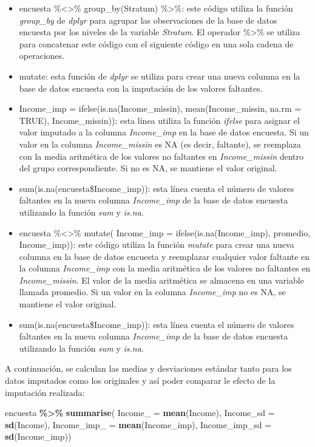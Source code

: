 \documentclass[
  12pt,
]{book}
\newenvironment{Shaded}{\begin{snugshade}}{\end{snugshade}}
\newcommand{\AttributeTok}[1]{\textcolor[rgb]{0.13,0.29,0.53}{#1}}
\newcommand{\FunctionTok}[1]{\textcolor[rgb]{0.13,0.29,0.53}{\textbf{#1}}}
\newcommand{\NormalTok}[1]{#1}
\newcommand{\SpecialCharTok}[1]{\textcolor[rgb]{0.81,0.36,0.00}{\textbf{#1}}}
\begin{document}
\begin{itemize}
\item
  encuesta \%\textless\textgreater\% group\_by(Stratum) \%\textgreater\%: este código utiliza la función \emph{group\_by} de \emph{dplyr} para agrupar las observaciones de la base de datos encuesta por los niveles de la variable \emph{Stratum}. El operador \%\textgreater\% se utiliza para concatenar este código con el siguiente código en una sola cadena de operaciones.
\item
  mutate: esta función de \emph{dplyr} se utiliza para crear una nueva columna en la base de datos encuesta con la imputación de los valores faltantes.
\item
  Income\_imp = ifelse(is.na(Income\_missin), mean(Income\_missin, na.rm = TRUE), Income\_missin)): esta línea utiliza la función \emph{ifelse} para asignar el valor imputado a la columna \emph{Income\_imp} en la base de datos encuesta. Si un valor en la columna \emph{Income\_missin} es NA (es decir, faltante), se reemplaza con la media aritmética de los valores no faltantes en \emph{Income\_missin} dentro del grupo correspondiente. Si no es NA, se mantiene el valor original.
\item
  sum(is.na(encuesta\$Income\_imp)): esta línea cuenta el número de valores faltantes en la nueva columna \emph{Income\_imp} de la base de datos encuesta utilizando la función \emph{sum} y \emph{is.na}.
\item
  encuesta \%\textless\textgreater\% mutate( Income\_imp = ifelse(is.na(Income\_imp), promedio, Income\_imp)): este código utiliza la función \emph{mutate} para crear una nueva columna en la base de datos encuesta y reemplazar cualquier valor faltante en la columna \emph{Income\_imp} con la media aritmética de los valores no faltantes en \emph{Income\_missin}. El valor de la media aritmética se almacena en una variable llamada promedio. Si un valor en la columna \emph{Income\_imp} no es NA, se mantiene el valor original.
\item
  sum(is.na(encuesta\$Income\_imp)): esta línea cuenta el número de valores faltantes en la nueva columna \emph{Income\_imp} de la base de datos encuesta utilizando la función \emph{sum} y \emph{is.na}.
\end{itemize}

A continuación, se calculan las medias y desviaciones estándar tanto para los datos imputados como los originales y así poder comparar le efecto de la imputación realizada:

\begin{Shaded}
\begin{Highlighting}[]
\NormalTok{encuesta }\SpecialCharTok{\%\textgreater{}\%} \FunctionTok{summarise}\NormalTok{(}
  \AttributeTok{Income\_ =} \FunctionTok{mean}\NormalTok{(Income),}
  \AttributeTok{Income\_sd =} \FunctionTok{sd}\NormalTok{(Income),}
  \AttributeTok{Income\_imp\_ =} \FunctionTok{mean}\NormalTok{(Income\_imp),}
  \AttributeTok{Income\_imp\_sd =} \FunctionTok{sd}\NormalTok{(Income\_imp))}
\end{Highlighting}
\end{Shaded}
\end{document}
